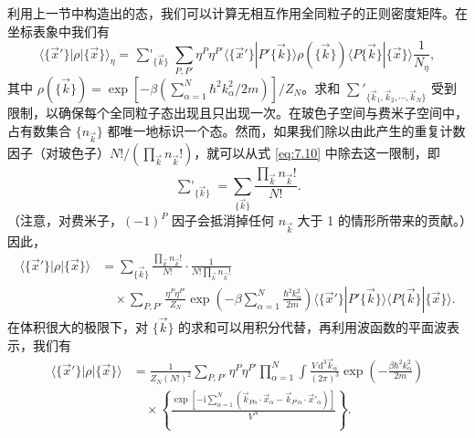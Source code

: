 利用上一节中构造出的态，我们可以计算无相互作用全同粒子的正则密度矩阵。在坐标表象中我们有
\begin{equation}\label{eq:7.10}
\langle\{\vec x'\}|\rho|\{\vec x\}\rangle_\eta=\mathop{{\sum}'}_{\{\vec k\}}\sum_{P,P'}\eta^P\eta^{P'}\langle\{\vec x'\}|P'\{\vec k\}\rangle\rho(\{\vec k\})\langle P\{\vec k\}|\{\vec x\}\rangle\frac1{N_\eta},
\end{equation}
其中 $\rho(\{\vec k\})=\exp[-\beta(\sum_{\alpha=1}^N\hbar^2k_\alpha^2/2m)]/Z_N$。求和 $\sum'_{\{\vec k_1,\vec k_2,\cdots,\vec k_N\}}$ 受到限制，以确保每个全同粒子态出现且只出现一次。在玻色子空间与费米子空间中，占有数集合 $\{n_{\vec k}\}$ 都唯一地标识一个态。然而，如果我们除以由此产生的重复计数因子（对玻色子）$N!/(\prod_{\vec k}n_{\vec k}!)$，就可以从式 \eqref{eq:7.10} 中除去这一限制，即
\begin{equation*}
\mathop{{\sum}'}_{\{\vec k\}}=\sum_{\{\vec k\}}\frac{\prod_{\vec k}n_{\vec k}!}{N!}.
\end{equation*}
（注意，对费米子，$(-1)^P$ 因子会抵消掉任何 $n_{\vec k}$ 大于 1 的情形所带来的贡献。）因此，
\begin{equation}\label{eq:7.11}
\begin{aligned}
\langle\{\vec x'\}|\rho|\{\vec x\}\rangle&=\sum_{\{\vec k\}}\frac{\prod_{\vec k}n_{\vec k}!}{N!}\cdot\frac1{N!\prod_{\vec k}n_{\vec k}!}\\
&\quad\times\sum_{P,P'}\frac{\eta^P\eta^{P'}}{Z_N}\exp\left(-\beta\sum_{\alpha=1}^N\frac{\hbar^2k_\alpha^2}{2m}\right)\langle\{\vec x'\}|P'\{\vec k\}\rangle\langle P\{\vec k\}|\{\vec x\}\rangle.
\end{aligned}
\end{equation}
在体积很大的极限下，对 $\{\vec k\}$ 的求和可以用积分代替，再利用波函数的平面波表示，我们有
\begin{equation}\label{eq:7.12}
\begin{aligned}
\langle\{\vec x'\}|\rho|\{\vec x\}\rangle&=\frac1{Z_N(N!)^2}\sum_{P,P'}\eta^P\eta^{P'}\prod_{\alpha=1}^N\int\frac{V\,\mathrm d^3\vec k_\alpha}{(2\pi)^3}\exp\left(-\frac{\beta\hbar^2k_\alpha^2}{2m}\right)\\
&\quad\times\left\{\frac{\exp\left[-\mathrm i\sum_{\alpha=1}^N\left(\vec k_{P\alpha}\cdot\vec x_\alpha-\vec k_{P'\alpha}\cdot\vec x'_\alpha\right)\right]}{V^N}\right\}.
\end{aligned}
\end{equation}


